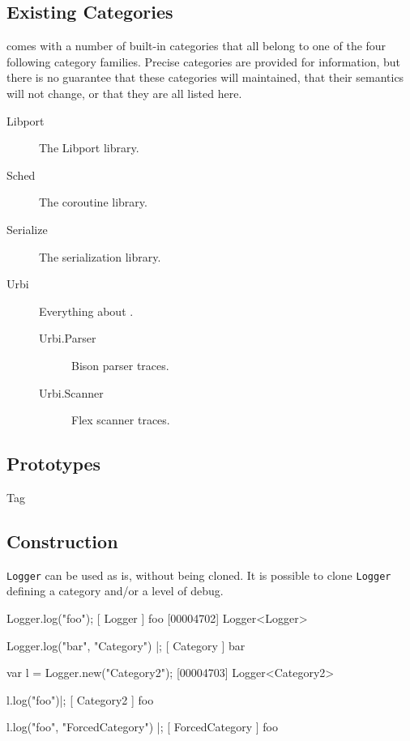 \subsection{Existing Categories}
\label{sec:logger:categories}
\usdk comes with a number of built-in categories that all belong to one of
the four following category families.  Precise categories are provided for
information, but there is no guarantee that these categories will
maintained, that their semantics will not change, or that they are all
listed here.

\begin{description}
\item[Libport] The Libport library.
\item[Sched] The coroutine library.
\item[Serialize] The serialization library.
\item[Urbi] Everything about \usdk.
  \begin{description}
  \item[Urbi.Parser] Bison parser traces.
  \item[Urbi.Scanner] Flex scanner traces.
  \end{description}
\end{description}


\subsection{Prototypes}
\begin{refObjects}
\item[Tag]
\end{refObjects}

\subsection{Construction}

\lstinline|Logger| can be used as is, without being cloned. It is possible
to clone \lstinline|Logger| defining a category and/or a level of debug.

\begin{urbiunchecked}
Logger.log("foo");
[        Logger         ] foo
[00004702] Logger<Logger>

Logger.log("bar", "Category") |;
[       Category        ] bar

var l = Logger.new("Category2");
[00004703] Logger<Category2>

l.log("foo")|;
[       Category2       ] foo

l.log("foo", "ForcedCategory") |;
[    ForcedCategory     ] foo
\end{urbiunchecked}

